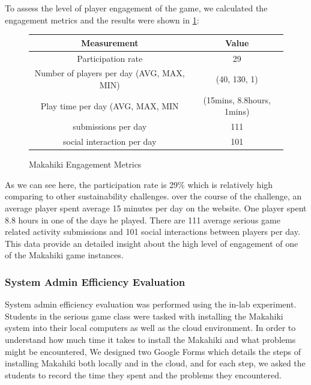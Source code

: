 \documentclass{sigchi}
\newcommand\tabhead[1]{\small\textbf{#1}}
\begin{document}
To assess the level of player engagement of the game, we calculated the engagement
metrics and the results were shown in \ref{fig:makahiki-engagement}:
\begin{figure}
  \centering
  \begin{tabular}{|c|c|}
    \hline
    \multicolumn{1}{|p{0.5\columnwidth}|}{\centering\tabhead{Measurement}} &
    \multicolumn{1}{|p{0.5\columnwidth}|}{\centering\tabhead{Value}} \\
    \hline
    \multicolumn{1}{|p{0.5\columnwidth}|}{Participation rate} &
    \multicolumn{1}{|p{0.5\columnwidth}|}{29} \\
    \hline
    \multicolumn{1}{|p{0.5\columnwidth}|}{Number of players per day (AVG, MAX, MIN)} &
    \multicolumn{1}{|p{0.5\columnwidth}|}{(40, 130, 1)} \\
    \hline
    \multicolumn{1}{|p{0.5\columnwidth}|}{Play time per day (AVG, MAX, MIN} &
    \multicolumn{1}{|p{0.5\columnwidth}|}{(15mins, 8.8hours, 1mins)} \\
    \hline
    \multicolumn{1}{|p{0.5\columnwidth}|}{submissions per day} &
    \multicolumn{1}{|p{0.5\columnwidth}|}{111} \\
    \hline
    \multicolumn{1}{|p{0.5\columnwidth}|}{social interaction per day} &
    \multicolumn{1}{|p{0.5\columnwidth}|}{101} \\
    \hline
  \end{tabular}
  \caption{Makahiki Engagement Metrics}
  \label{fig:makahiki-engagement}
\end{figure}

As we can see here, the participation rate is 29\% which is relatively high comparing to other sustainability challenges. over the course of the challenge, an average player spent average 15 minutes per day on the website. One player spent 8.8 hours in one of the days he played. There are 111 average serious game related activity submissions and 101 social interactions between players per day. This data provide an detailed insight about the high level of engagement of one of the Makahiki game instances.

\subsubsection{System Admin Efficiency Evaluation}

System admin efficiency evaluation was performed using the in-lab experiment.
Students in the serious game class were tasked with installing the Makahiki
system into their local computers as well as the cloud environment. In
order to understand how much time it takes to install the Makahiki and
what problems might be encountered, We designed two Google Forms which
details the steps of installing Makahiki both locally and in the
cloud, and for each step, we asked the students to record the time
they spent and the problems they encountered.
\end{document}
